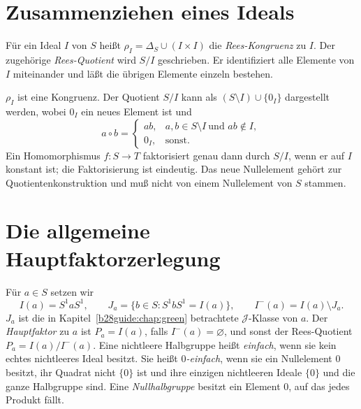 \section{Zusammenziehen eines Ideals}

\begin{definition}
Für ein Ideal $I$ von $S$ heißt $\rho_I=\Delta_S\cup(I\times I)$ die \emph{Rees-Kongruenz} zu $I$.
Der zugehörige \emph{Rees-Quotient} wird $S/I$ geschrieben.
Er identifiziert alle Elemente von $I$ miteinander und läßt
die übrigen Elemente einzeln bestehen.
\end{definition}

\begin{theorem}
\label{b28guide:thm:rees-quotient}
$\rho_I$ ist eine Kongruenz.
Der Quotient $S/I$ kann als $(S\setminus I)\cup\{0_I\}$ dargestellt
werden, wobei $0_I$ ein neues Element ist und
\[
 a\circ b=
 \begin{cases}
 ab,&a,b\in S\setminus I\ \text{und }ab\notin I,\\
 0_I,&\text{sonst}.
 \end{cases}
\]
Ein Homomorphismus $f:S\to T$ faktorisiert genau dann durch $S/I$,
wenn er auf $I$ konstant ist; die Faktorisierung ist eindeutig.
Das neue Nullelement gehört zur Quotientenkonstruktion und muß
nicht von einem Nullelement von $S$ stammen.
\cite{harju,howie}
\end{theorem}

\section{Die allgemeine Hauptfaktorzerlegung}

\begin{definition}
Für $a\in S$ setzen wir
\[
 I(a)=S^1aS^1,\qquad
 J_a=\{b\in S:S^1bS^1=I(a)\},\qquad
 I^-(a)=I(a)\setminus J_a .
\]
$J_a$ ist die in Kapitel~\ref{b28guide:chap:green} betrachtete
$\mathcal J$-Klasse von $a$.
Der \emph{Hauptfaktor} zu $a$ ist $P_a=I(a)$, falls $I^-(a)=\varnothing$, und sonst der Rees-Quotient $P_a=I(a)/I^-(a)$.
Eine nichtleere Halbgruppe heißt \emph{einfach}, wenn sie kein echtes
nichtleeres Ideal besitzt.
Sie heißt \emph{$0$-einfach}, wenn sie ein Nullelement $0$ besitzt,
ihr Quadrat nicht $\{0\}$ ist und ihre einzigen nichtleeren Ideale
$\{0\}$ und die ganze Halbgruppe sind.
Eine \emph{Nullhalbgruppe} besitzt ein Element $0$, auf das jedes
Produkt fällt.
\end{definition}

